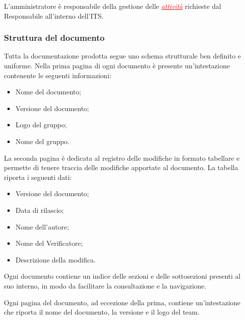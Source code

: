 L'amministratore è responsabile della gestione delle \textcolor{red}{\uline{\textit{attività}}} richieste dal Responsabile all'interno dell'ITS.

\subsubsection{Struttura del documento}
Tutta la documentazione prodotta segue uno schema strutturale ben definito e uniforme.
Nella prima pagina di ogni documento è presente un'intestazione contenente le seguenti informazioni:
\begin{itemize}
    \item Nome del documento;
    \item Versione del documento;
    \item Logo del gruppo;
    \item Nome del gruppo.
\end{itemize}

La seconda pagina è dedicata al registro delle modifiche in formato tabellare e permette di tenere traccia delle modifiche apportate al documento.
La tabella riporta i seguenti dati:
\begin{itemize}
    \item Versione del documento;
    \item Data di rilascio;
    \item Nome dell'autore;
    \item Nome del Verificatore;
    \item Descrizione della modifica.
\end{itemize}

Ogni documento contiene un indice delle sezioni e delle sottosezioni presenti al suo interno, in modo da facilitare la consultazione e la navigazione.

Ogni pagina del documento, ad eccezione della prima, contiene un'intestazione che riporta il nome del documento, la versione e il logo del team.

